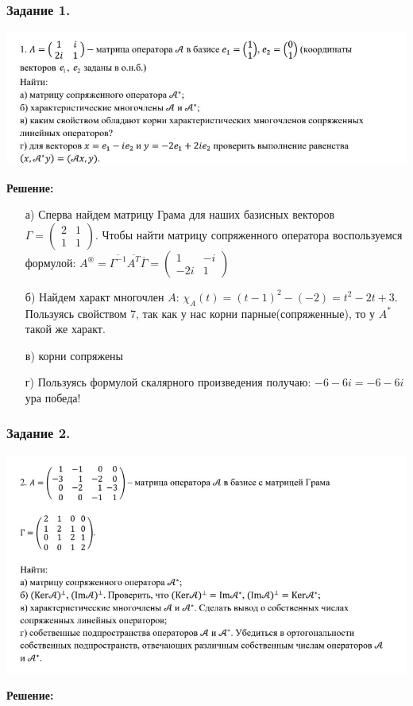 \subsubsection{Задание 1.}
\begin{center}
   \includegraphics[width = 15 cm]{assets/homework-6-task-1.jpg}
\end{center}
\textbf{Решение:}

\begin{enumerate}
    \item[а)] Сперва найдем матрицу Грама для наших базисных векторов $\Gamma = \begin{pmatrix}
        2 & 1\\
        1 & 1
    \end{pmatrix}$. Чтобы найти матрицу сопряженного оператора воспользуемся формулой: $A^\circledast = \overline{\Gamma^{-1}}\overline{A^T}\overline{\Gamma} = \begin{pmatrix}
        1 & -i\\
        -2i & 1
    \end{pmatrix}$
    \item[б)] Найдем характ многочлен $A$: $\chi_A(t) = (t-1)^2 - (-2) = t^2-2t+3$. Пользуясь свойством 7, так как у нас корни парные(сопряженные), то у $A^*$ такой же характ. 

    \item[в)] корни сопряжены
    \item[г)] Пользуясь формулой скалярного произведения получаю: $-6 -6i = -6-6i$ ура победа!
\end{enumerate}

\subsubsection{Задание 2.}

\begin{center}
   \includegraphics[width = 15 cm]{assets/homework-6-task-2.jpg}
\end{center}
\textbf{Решение:}

